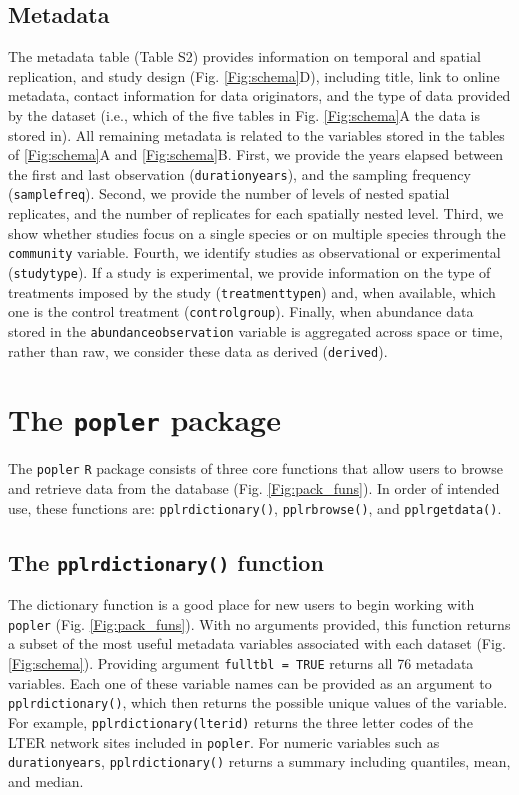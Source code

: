 \documentclass{article}\usepackage[]{graphicx}\usepackage[]{color}
\begin{document}
\subsection*{Metadata}
The metadata table (Table S2) provides information on temporal and spatial replication, and study design (Fig. \ref{Fig:schema}D), including title, link to online metadata, contact information for data originators, and the type of data provided by the dataset (i.e., which of the five tables in Fig. \ref{Fig:schema}A the data is stored in). All remaining metadata is related to the variables stored in the tables of \ref{Fig:schema}A and \ref{Fig:schema}B. First, we provide the years elapsed between the first and last observation (\texttt{duration\textunderscore years}), and the sampling frequency (\texttt{samplefreq}). Second, we provide the number of levels of nested spatial replicates, and the number of replicates for each spatially nested level. Third, we show whether studies focus on a single species or on multiple species through the \texttt{community} variable. Fourth, we identify studies as observational or experimental (\texttt{studytype}). If a study is experimental, we provide information on the type of treatments imposed by the study (\texttt{treatment\textunderscore type\textunderscore n}) and, when available, which one is the control treatment (\texttt{control\textunderscore group}). Finally, when abundance data stored in the \texttt{abundance\textunderscore observation} variable is aggregated across space or time, rather than raw, we consider these data as derived (\texttt{derived}).

\section*{The \texttt{popler} package}
The \texttt{popler} \texttt{R} package consists of three core functions that allow users to browse and retrieve data from the database (Fig. \ref{Fig:pack_funs}). In order of intended use, these functions are: \texttt{pplr\textunderscore dictionary()}, \texttt{pplr\textunderscore browse()}, and \texttt{pplr\textunderscore get\textunderscore data()}.

\subsection*{The \texttt{pplr\textunderscore dictionary()} function}
The dictionary function is a good place for new users to begin working with \texttt{popler} (Fig. \ref{Fig:pack_funs}). With no arguments provided, this function returns a subset of the most useful metadata variables associated with each  dataset (Fig. \ref{Fig:schema}). Providing argument \texttt{full\textunderscore tbl = TRUE} returns all 76 metadata variables. Each one of these variable names can be provided as an argument to \texttt{pplr\textunderscore dictionary()}, which then returns the possible unique values of the variable. For example, \texttt{pplr\textunderscore dictionary(lterid)} returns the three letter codes of the LTER network sites included in \texttt{popler}. For numeric variables such as \texttt{duration\textunderscore years}, \texttt{pplr\textunderscore dictionary()} returns a summary including quantiles, mean, and median. 
\end{document}
